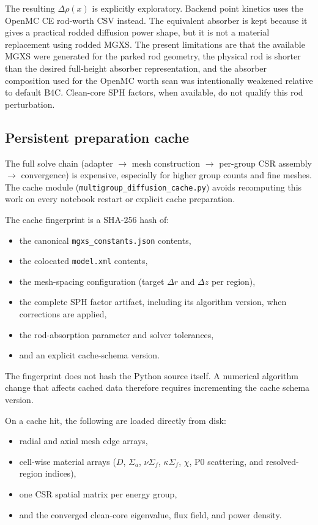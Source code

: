 \documentclass[11pt]{article}
\begin{document}
The resulting $\Delta\rho(x)$ is explicitly exploratory.  Backend point
kinetics uses the OpenMC CE rod-worth CSV instead.  The equivalent absorber is
kept because it gives a practical rodded diffusion power shape, but it is not a
material replacement using rodded MGXS.  The present limitations are that the
available MGXS were generated for the parked rod geometry, the physical rod is
shorter than the desired full-height absorber representation, and the absorber
composition used for the OpenMC worth scan was intentionally weakened relative
to default B4C.  Clean-core SPH factors, when available, do not qualify this
rod perturbation.

\subsection{Persistent preparation cache}

The full solve chain (adapter $\to$ mesh construction $\to$ per-group CSR
assembly $\to$ convergence) is expensive, especially for higher group counts
and fine meshes.  The cache module
(\texttt{multigroup\_diffusion\_cache.py}) avoids recomputing this work on
every notebook restart or explicit cache preparation.

The cache fingerprint is a SHA-256 hash of:
\begin{itemize}
  \item the canonical \texttt{mgxs\_constants.json} contents,
  \item the colocated \texttt{model.xml} contents,
  \item the mesh-spacing configuration (target $\Delta r$ and $\Delta z$ per
        region),
  \item the complete SPH factor artifact, including its algorithm version,
        when corrections are applied,
  \item the rod-absorption parameter and solver tolerances,
  \item and an explicit cache-schema version.
\end{itemize}

The fingerprint does not hash the Python source itself.  A numerical algorithm
change that affects cached data therefore requires incrementing the cache
schema version.

On a cache hit, the following are loaded directly from disk:
\begin{itemize}
  \item radial and axial mesh edge arrays,
  \item cell-wise material arrays ($D$, $\Sigma_a$, $\nu\Sigma_f$,
        $\kappa\Sigma_f$, $\chi$, P0 scattering, and resolved-region indices),
  \item one CSR spatial matrix per energy group,
  \item and the converged clean-core eigenvalue, flux field, and power density.
\end{itemize}
\end{document}
